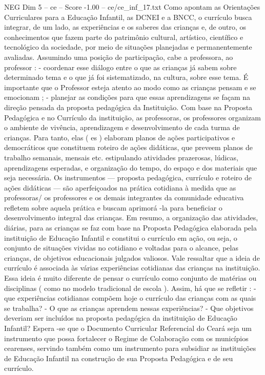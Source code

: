 \begin{textsample}{NEG Dim 5 – ce – Score -1.00 – ce/ce\_inf\_17.txt}
Como apontam as Orientações Curriculares para a Educação Infantil, as DCNEI e a BNCC, o currículo busca integrar, de um lado, as experiências e os saberes das crianças e, de outro, os conhecimentos que fazem parte do patrimônio cultural, artístico, científico e tecnológico da sociedade, por meio de situações planejadas e permanentemente avaliadas.
Assumindo uma posição de participação, cabe a professora, ao professor : - coordenar esse diálogo entre o que as crianças já sabem sobre determinado tema e o que já foi sistematizado, na cultura, sobre esse tema.
É importante que o Professor esteja atento ao modo como as crianças pensam e se emocionam ; - planejar as condições para que essas aprendizagens se façam na direção pensada da proposta pedagógica da Instituição.
Com base na Proposta Pedagógica e no Currículo da instituição, as professoras, os professores organizam o ambiente de vivência, aprendizagem e desenvolvimento de cada turma de crianças.
Para tanto, elas ( es ) elaboram planos de ações participativos e democráticos que constituem roteiro de ações didáticas, que preveem planos de trabalho semanais, mensais etc. estipulando atividades prazerosas, lúdicas, aprendizagens esperadas, e organização do tempo, do espaço e dos materiais que seja necessária.
Os instrumentos — proposta pedagógica, currículo e roteiro de ações didáticas — são aperfeiçoados na prática cotidiana à medida que as professoras/ os professores e os demais integrantes da comunidade educativa refletem sobre aquela prática e buscam aprimorá -la para beneficiar o desenvolvimento integral das crianças.
Em resumo, a organização das atividades, diárias, para as crianças se faz com base na Proposta Pedagógica elaborada pela instituição de Educação Infantil e constitui o currículo em ação, ou seja, o conjunto de situações vividas no cotidiano e voltadas para o alcance, pelas crianças, de objetivos educacionais julgados valiosos.
Vale ressaltar que a ideia de currículo é associada às várias experiências cotidianas das crianças na instituição.
Essa ideia é muito diferente de pensar o currículo como conjunto de matérias ou disciplinas ( como no modelo tradicional de escola ).
Assim, há que se refletir : - que experiências cotidianas compõem hoje o currículo das crianças com as quais se trabalha? - O que as crianças aprendem nessas experiências? - Que objetivos deveriam ser incluídos na proposta pedagógica da instituição de Educação Infantil?
Espera -se que o Documento Curricular Referencial do Ceará seja um instrumento que possa fortalecer o Regime de Colaboração com os municípios cearenses, servindo também como um instrumento para subsidiar as instituições de Educação Infantil na construção de sua Proposta Pedagógica e de seu currículo.

\end{textsample}
